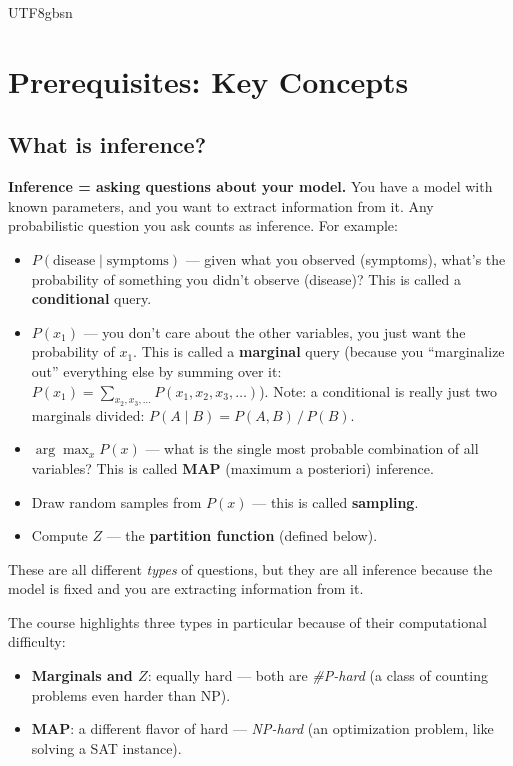 \documentclass[11pt]{article}
\begin{document}
\begin{CJK}{UTF8}{gbsn}
\section*{Prerequisites: Key Concepts}

\subsection*{What is inference?}

\textbf{Inference = asking questions about your model.} You have a model with known parameters, and you want to extract information from it. Any probabilistic question you ask counts as inference. For example:

\begin{itemize}[itemsep=4pt]
  \item $P(\text{disease} \mid \text{symptoms})$ --- given what you observed (symptoms), what's the probability of something you didn't observe (disease)? This is called a \textbf{conditional} query.
  \item $P(x_1)$ --- you don't care about the other variables, you just want the probability of $x_1$. This is called a \textbf{marginal} query (because you ``marginalize out'' everything else by summing over it: $P(x_1) = \sum_{x_2, x_3, \dots} P(x_1, x_2, x_3, \dots)$). Note: a conditional is really just two marginals divided: $P(A \mid B) = P(A, B) \,/\, P(B)$.
  \item $\arg\max_x P(x)$ --- what is the single most probable combination of all variables? This is called \textbf{MAP} (maximum a posteriori) inference.
  \item Draw random samples from $P(x)$ --- this is called \textbf{sampling}.
  \item Compute $Z$ --- the \textbf{partition function} (defined below).
\end{itemize}

These are all different \emph{types} of questions, but they are all inference because the model is fixed and you are extracting information from it.

The course highlights three types in particular because of their computational difficulty:
\begin{itemize}
  \item \textbf{Marginals and $Z$}: equally hard --- both are \emph{\#P-hard} (a class of counting problems even harder than NP).
  \item \textbf{MAP}: a different flavor of hard --- \emph{NP-hard} (an optimization problem, like solving a SAT instance).
\end{itemize}


\end{CJK}
\end{document}
